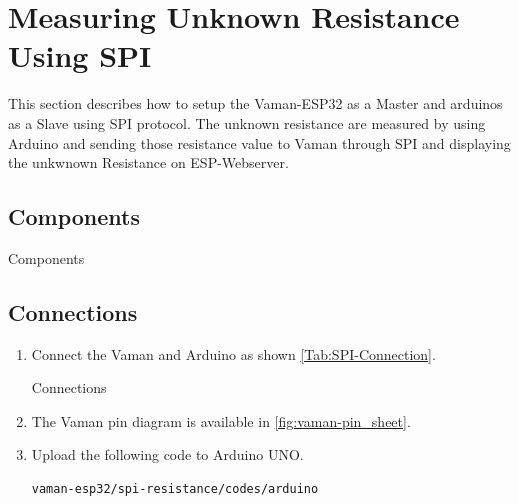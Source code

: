 \section{Measuring Unknown Resistance Using SPI}
This section describes how to setup the Vaman-ESP32 as a Master and  arduinos as a Slave using SPI protocol. The  unknown resistance are measured by using Arduino and sending those  resistance value to Vaman through SPI and displaying the unkwnown Resistance on ESP-Webserver.
\subsection{Components}
\begin{table}[!ht]
\centering

\caption{Components}
\label{table:SPI-components}
\end{table}

\subsection{Connections}
\begin{enumerate}
\item
Connect the Vaman and Arduino as shown \autoref{Tab:SPI-Connection}.

\begin{table}[!ht]
\centering

\caption{Connections}
\label{Tab:SPI-Connection}
\end{table}
\item
The Vaman pin diagram is available in \autoref{fig:vaman-pin_sheet}.

\item Upload the following code to Arduino UNO.
\begin{lstlisting}
vaman-esp32/spi-resistance/codes/arduino
\end{lstlisting}
\end{enumerate}
